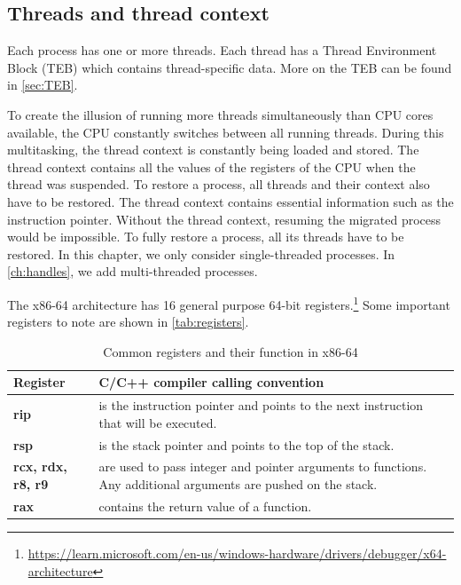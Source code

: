 \documentclass[a4paper, 11pt, english]{report}
\begin{document}
\subsection{Threads and thread context}
Each process has one or more threads. Each thread has a Thread Environment Block (TEB) which contains thread-specific data. More on the TEB can be found in \autoref{sec:TEB}.

To create the illusion of running more threads simultaneously than CPU cores available, the CPU constantly switches between all running threads. During this multitasking, the thread context is constantly being loaded and stored. The thread context contains all the values of the registers of the CPU when the thread was suspended. To restore a process, all threads and their context also have to be restored.
The thread context contains essential information such as the instruction pointer. Without the thread context, resuming the migrated process would be impossible. To fully restore a process, all its threads have to be restored. In this chapter, we only consider single-threaded processes. In \autoref{ch:handles}, we add multi-threaded processes.

The x86-64 architecture has 16 general purpose 64-bit registers.\footnote{\url{https://learn.microsoft.com/en-us/windows-hardware/drivers/debugger/x64-architecture}} Some important registers to note are shown in \autoref{tab:registers}.

\begin{table}[h]
	\begin{tabular}{p{} p{} }
		\hline
		\textbf{Register} & \textbf{C/C++ compiler calling convention } \\
		\hline
		\textbf{rip} & is the instruction pointer and points to the next instruction that will be executed. \\
		\textbf{rsp} & is the stack pointer and points to the top of the stack. \\
		\textbf{rcx, rdx,} \newline \textbf{r8, r9} & are used to pass integer and pointer arguments to functions. Any additional arguments are pushed on the stack. \\
		\textbf{rax} & contains the return value of a function. \\
		\hline
	\end{tabular}
	\caption{Common registers and their function in x86-64}
	\label{tab:registers}
\end{table}
\end{document}
